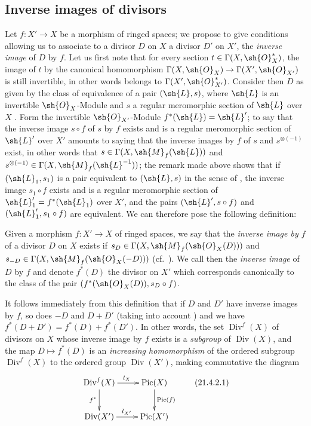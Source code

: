 \subsection{Inverse images of divisors}
\label{subsection:IV.21.4}
\label{IV.21.4}

\begin{env}[21.4.1]
\label{IV.21.4.1}
Let $f:X'\to X$ be a morphism of ringed spaces;
we propose to give conditions allowing us to associate to a divisor $D$ on $X$ a divisor $D'$ on $X'$, the \emph{inverse image} of $D$ by $f$.
Let us first note that for every section $t\in\Gamma(X,\sh{O}_X^*)$, the image of $t$ by the canonical homomorphism $\Gamma(X,\sh{O}_X)\to\Gamma(X',\sh{O}_{X'})$ is still invertible, in other words belongs to $\Gamma(X',\sh{O}_{X'}^*)$.
Consider then $D$ as given by the class of equivalence of a pair $(\sh{L},s)$, where $\sh{L}$ is an invertible $\sh{O}_X$-Module and $s$ a regular meromorphic section of $\sh{L}$ over $X$ .
Form the invertible $\sh{O}_{X'}$-Module $f^*(\sh{L})=\sh{L}'$;
to say that the inverse image $s\circ f$ of $s$ by $f$ exists  and is a regular meromorphic section of $\sh{L}'$ over $X'$ amounts to saying that the inverse images by $f$ of $s$ and $s^{\otimes(-1)}$ exist, in other words that $s\in\Gamma(X,\sh{M}_f(\sh{L}))$ and $s^{\otimes(-1)}\in\Gamma(X,\sh{M}_f(\sh{L}^{-1}))$;
the remark made above shows that if $(\sh{L}_1,s_1)$ is a pair equivalent to $(\sh{L},s)$ in the sense of , the inverse image $s_1\circ f$ exists and is a regular meromorphic section of $\sh{L}_1'=f^*(\sh{L}_1)$ over $X'$, and the pairs $(\sh{L}',s\circ f)$ and $(\sh{L}_1',s_1\circ f)$ are equivalent.
We can therefore pose the following definition:
\end{env}

\begin{definition}[21.4.2]
\label{IV.21.4.2}
Given a morphism $f:X'\to X$ of ringed spaces, we say that the \emph{inverse image by $f$} of a divisor $D$ on $X$ exists if $s_D\in\Gamma(X,\sh{M}_f(\sh{O}_X(D)))$ and $s_{-D}\in\Gamma(X,\sh{M}_f(\sh{O}_X(-D)))$ (cf.\ ).
We call then the \emph{inverse image} of $D$ by $f$ and denote $f^*(D)$ the divisor on $X'$ which corresponds canonically  to the class of the pair $(f^*(\sh{O}_X(D)),s_D\circ f)$.
\end{definition}

It follows immediately from this definition that if $D$ and $D'$ have inverse images by $f$, so does $-D$ and $D+D'$ (taking into account ) and we have
$f^*(D+D')=f^*(D)+f^*(D')$.
In other words, the set $\operatorname{Div}^f(X)$ of divisors on $X$ whose inverse image by $f$ exists is a \emph{subgroup} of $\operatorname{Div}(X)$, and the map $D\mapsto f^*(D)$ is an \emph{increasing homomorphism} of the ordered subgroup $\operatorname{Div}^f(X)$ to the ordered group $\operatorname{Div}(X')$, making commutative the diagram
\[
\label{IV.21.4.2.1}
  \xymatrix{
    \operatorname{Div}^f(X) \ar[r]^{l_X} \ar[d]_{f^*} & \operatorname{Pic}(X) \ar[d]^{\operatorname{Pic}(f)} \\
    \operatorname{Div}(X') \ar[r]^{l_{X'}} & \operatorname{Pic}(X')
  }
  \tag{21.4.2.1}
\]

